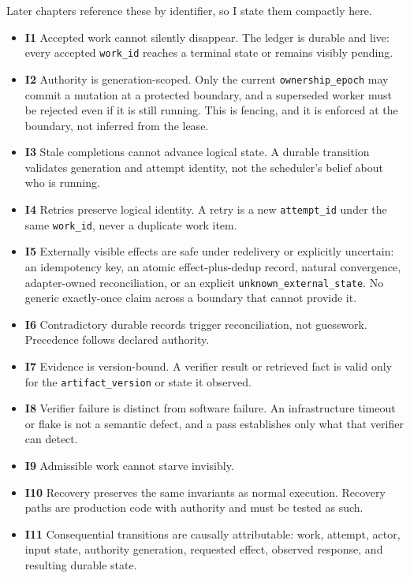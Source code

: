 Later chapters reference these by identifier, so I state them compactly here.

\begin{itemize}
\tightlist
\item
  \textbf{I1} Accepted work cannot silently disappear. The ledger is durable and live: every accepted \texttt{work\_id} reaches a terminal state or remains visibly pending.
\item
  \textbf{I2} Authority is generation-scoped. Only the current \texttt{ownership\_epoch} may commit a mutation at a protected boundary, and a superseded worker must be rejected even if it is still running. This is fencing, and it is enforced at the boundary, not inferred from the lease.
\item
  \textbf{I3} Stale completions cannot advance logical state. A durable transition validates generation and attempt identity, not the scheduler's belief about who is running.
\item
  \textbf{I4} Retries preserve logical identity. A retry is a new \texttt{attempt\_id} under the same \texttt{work\_id}, never a duplicate work item.
\item
  \textbf{I5} Externally visible effects are safe under redelivery or explicitly uncertain: an idempotency key, an atomic effect-plus-dedup record, natural convergence, adapter-owned reconciliation, or an explicit \texttt{unknown\_external\_state}. No generic exactly-once claim across a boundary that cannot provide it.
\item
  \textbf{I6} Contradictory durable records trigger reconciliation, not guesswork. Precedence follows declared authority.
\item
  \textbf{I7} Evidence is version-bound. A verifier result or retrieved fact is valid only for the \texttt{artifact\_version} or state it observed.
\item
  \textbf{I8} Verifier failure is distinct from software failure. An infrastructure timeout or flake is not a semantic defect, and a pass establishes only what that verifier can detect.
\item
  \textbf{I9} Admissible work cannot starve invisibly.
\item
  \textbf{I10} Recovery preserves the same invariants as normal execution. Recovery paths are production code with authority and must be tested as such.
\item
  \textbf{I11} Consequential transitions are causally attributable: work, attempt, actor, input state, authority generation, requested effect, observed response, and resulting durable state.
\end{itemize}

